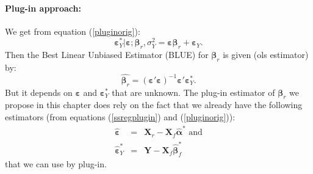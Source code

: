 \documentclass[12pt,a4paper]{report}
\begin{document}
\paragraph{Plug-in approach:}
We get from equation (\ref{pluginorig}):%
\begin{equation}
	\boldsymbol{\varepsilon}_Y^*|\boldsymbol{\varepsilon};\boldsymbol{\beta}_r,\sigma_Y^2=\boldsymbol{\varepsilon}\boldsymbol{\beta}_r+\boldsymbol{\varepsilon}_Y. \label{eq:regplugin} \nonumber
\end{equation}
Then the Best Linear Unbiased Estimator ({\sc BLUE}) for $\boldsymbol{\beta}_r$ is given ({\sc ols} estimator) by:
\begin{equation}
  \hat{\boldsymbol{\beta}_r}=(\boldsymbol{\varepsilon}'\boldsymbol{\varepsilon})^{-1}\boldsymbol{\varepsilon}'\boldsymbol{\varepsilon}_Y^* . \label{olsplugin}
\end{equation}
    But it depends on $\boldsymbol{\varepsilon}$ and $\boldsymbol{\varepsilon}_Y^*$ that are unknown.
The plug-in estimator of $\boldsymbol{\beta}_r$ we propose in this chapter does rely on the fact that we already have the following estimators (from equations (\ref{ssregplugin}) and (\ref{pluginorig})):
	\begin{eqnarray}
		\hat{\boldsymbol{\varepsilon}}&=& \boldsymbol{X}_r-\boldsymbol{X}_f\hat{\boldsymbol{\alpha}}^* \nonumber \textrm{ and} \\
		\hat{\boldsymbol{\varepsilon}}_Y^*&=&\boldsymbol{Y}-\boldsymbol{X}_f\hat{\boldsymbol{\beta}}_f^* \nonumber
	\end{eqnarray}
	that we can use by plug-in.%
\end{document}
